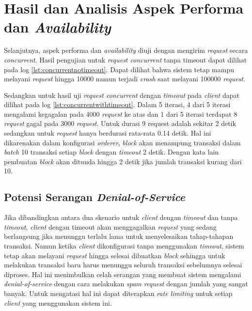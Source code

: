 

\section{Hasil dan Analisis Aspek Performa dan \textit{Availability}}
Selanjutnya, aspek performa dan \textit{availability} diuji dengan mengirim \textit{request} secara \textit{concurrent}. Hasil pengujian untuk \textit{request concurrent} tanpa timeout dapat dilihat pada log \ref{lst:concurrentnotimeout}. Dapat dilihat bahwa sistem tetap mampu melayani \textit{request} hingga 10000 namun terjadi \textit{crash} saat melayani 100000 \textit{request}. 



Sedangkan untuk hasil uji \textit{request concurrent} dengan \textit{timeout} pada \textit{client} dapat dilihat pada log \ref{lst:concurrentwithtimeout}. Dalam 5 iterasi, 4 dari 5 iterasi mengalami kegagalan pada 4000 \textit{request} ke atas dan 1 dari 5 iterasi terdapat 8 \textit{request} gagal pada 3000 \textit{request}. Untuk durasi 9 request adalah sekitar 2 detik sedangkan untuk \textit{request} hanya berdurasi rata-rata 0.14 detik. Hal ini dikarenakan dalam konfigurasi \textit{orderer}, \textit{block} akan menampung transaksi dalam \textit{batch} 10 transaksi setiap \textit{block} dengan \textit{timeout} 2 detik. Dengan kata lain pembuatan \textit{block} akan ditunda hingga 2 detik jika jumlah transaksi kurang dari 10.



\subsection{Potensi Serangan \textit{Denial-of-Service}}
Jika dibandingkan antara dua skenario untuk \textit{client} dengan \textit{timeout} dan tanpa \textit{timeout}, \textit{client} dengan timeout akan menggagalkan \textit{request} yang sedang berlangsung jika menunggu terlalu lama untuk menyelesaikan tahap-tahapan transaksi. Namun ketika \textit{client} dikonfigurasi tanpa menggunakan \textit{timeout}, sistem tetap akan melayani \textit{request} hingga selesai dibuatkan \textit{block} sehingga untuk melakukan transaksi baru harus menunggu seluruh transaksi sebelumnya selesai diproses. Hal ini menimbulkan celah serangan yang membuat sistem mengalami \textit{denial-of-service} dengan cara melakukan \textit{spam request} dengan jumlah yang sangat banyak. Untuk mengatasi hal ini dapat diterapkan \textit{rate limiting} untuk setiap \textit{client} yang menggunakan sistem ini.
